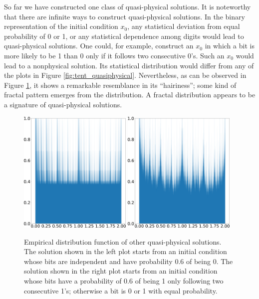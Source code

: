So far we have constructed one class of quasi-physical solutions.
It is noteworthy that there are infinite ways to 
construct quasi-physical solutions.  In the binary representation 
of the initial condition $x_0$, any statistical
deviation from equal probability of 0 or 1, or any statistical
dependence among digits would lead to quasi-physical solutions.
One could, for example, construct an $x_0$ in which a bit is
more likely to be 1 than 0 only if it follows two consecutive 0's.
Such an $x_0$ would lead to a nonphysical solution.  Its statistical
distribution would differ from any of the plots in Figure
\ref{fig:tent_quasiphysical}.  Nevertheless, as can be
observed in Figure \ref{fig:tent_alternative}, it shows
a remarkable resemblance in its ``hairiness''; some kind of fractal
pattern emerges from the distribution.  A fractal distribution
appears to be a signature of quasi-physical solutions.
\begin{figure}\centering
    \centering
    \includegraphics[width=0.48\textwidth]{tent_quasiphysical_alternaive1_hist_p_0.6.png}
    \hspace{0.02\textwidth}
    \includegraphics[width=0.48\textwidth]{tent_quasiphysical_alternaive2_hist_p_0.6.png}
    \caption{Empirical distribution function of other quasi-physical solutions.
    The solution shown in the left plot starts from an initial condition
    whose bits are independent and have probability 0.6 of being 0.
    The solution shown in the right plot starts from an initial condition
    whose bits have a probability of 0.6 of being 1 only following two
    consecutive 1's; otherwise a bit is 0 or 1 with equal probability.}
    \label{fig:tent_alternative}
\end{figure}

